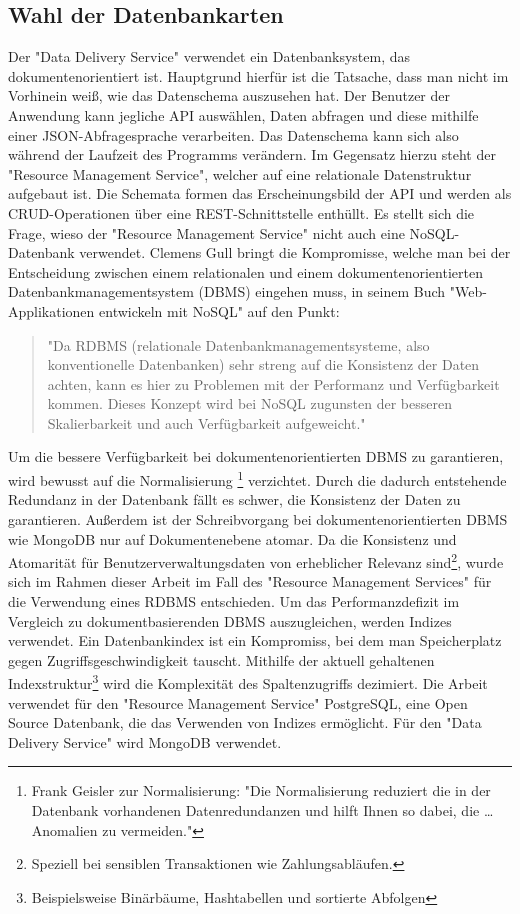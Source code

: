 \subsection{Wahl der Datenbankarten}
\label{subsec:wahlderdatenbankarten}
Der "Data Delivery Service" verwendet ein Datenbanksystem, das dokumentenorientiert ist.
Hauptgrund hierfür ist die Tatsache, dass man nicht im Vorhinein weiß, wie das
Datenschema auszusehen hat. Der Benutzer der Anwendung kann jegliche API
auswählen, Daten abfragen und diese mithilfe einer JSON-Abfragesprache verarbeiten. Das Datenschema
kann sich also während der Laufzeit des Programms verändern. Im Gegensatz hierzu steht der "Resource
Management Service", welcher auf eine relationale Datenstruktur aufgebaut ist. Die Schemata formen das
Erscheinungsbild der API und werden als CRUD-Operationen über eine REST-Schnittstelle enthüllt.
Es stellt sich die Frage, wieso der "Resource Management Service" nicht auch eine NoSQL-Datenbank verwendet.
Clemens Gull bringt die Kompromisse, welche man bei der Entscheidung zwischen einem relationalen
und einem dokumentenorientierten Datenbankmanagementsystem (DBMS) eingehen muss, in seinem Buch "Web-Applikationen
entwickeln mit NoSQL" auf den Punkt:

\begin{quote}
"Da RDBMS (relationale Datenbankmanagementsysteme, also konventionelle Datenbanken) sehr streng
auf die Konsistenz der Daten achten, kann es hier zu Problemen mit der Performanz und Verfügbarkeit
kommen. Dieses Konzept wird bei NoSQL zugunsten der besseren Skalierbarkeit und auch Verfügbarkeit
aufgeweicht."\cite[S. 18]{NoSQLClemensGull}
\end{quote}

Um die bessere Verfügbarkeit bei dokumentenorientierten DBMS zu garantieren, wird bewusst auf die Normalisierung
\footnote{Frank Geisler zur Normalisierung: "Die Normalisierung reduziert die in der Datenbank vorhandenen Datenredundanzen und hilft Ihnen so dabei, die \dots Anomalien zu vermeiden."\cite[S. 177]{DatenbankenFrankGeisler}}
verzichtet. Durch die dadurch entstehende Redundanz in der Datenbank fällt es schwer,
die Konsistenz der Daten zu garantieren. Außerdem ist der Schreibvorgang bei dokumentenorientierten
DBMS wie MongoDB nur auf Dokumentenebene atomar.\cite{MongoDBAtomaritaet} Da die Konsistenz und Atomarität für
Benutzerverwaltungsdaten von erheblicher Relevanz sind\footnote{Speziell bei sensiblen Transaktionen wie Zahlungsabläufen.},
wurde sich im Rahmen dieser Arbeit im Fall des "Resource Management Services" für die Verwendung eines RDBMS entschieden.
Um das Performanzdefizit im Vergleich zu dokumentbasierenden DBMS auszugleichen,
werden Indizes verwendet. Ein Datenbankindex ist ein Kompromiss, bei dem
man Speicherplatz gegen Zugriffsgeschwindigkeit tauscht.\cite{YoutubePostgresIndexing}
Mithilfe der aktuell gehaltenen Indexstruktur\footnote{Beispielsweise Binärbäume, Hashtabellen und sortierte Abfolgen}
wird die Komplexität des Spaltenzugriffs dezimiert. Die Arbeit verwendet für den "Resource Management Service"
PostgreSQL, eine Open Source Datenbank, die das Verwenden von Indizes ermöglicht. Für den "Data Delivery Service"
wird MongoDB verwendet. 

